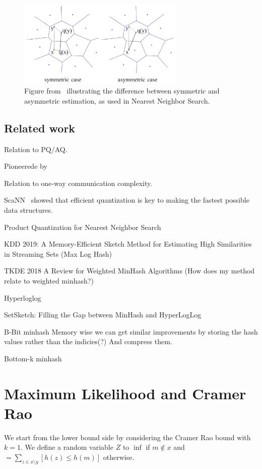 \begin{figure}[h]
   \centering
   \includegraphics[width=8cm]{figures/pq}
\caption{Figure from~\cite{jegou2010product} illustrating the difference between symmetric and asymmetric estimation, as used in Nearest Neighbor Search.
}
\end{figure}

\subsection{Related work}

Relation to PQ/AQ.

Pioneerede by~\cite{jegou2010product} 

Relation to one-way communication complexity.

ScaNN~\cite{guo2020accelerating} showed that efficient quantization is key to making the fastest possible data structures.

Product Quantization for Nearest Neighbor Search


KDD 2019: A Memory-Efficient Sketch Method for Estimating High Similarities in Streaming Sets
(Max Log Hash)

TKDE 2018 A Review for Weighted MinHash Algorithms
(How does my method relate to weighted minhash?)

Hyperloglog

SetSketch: Filling the Gap between MinHash and HyperLogLog

B-Bit minhash
Memory wise we can get similar improvements by storing the hash values rather than the indicies(?) And compress them.

Bottom-k minhash

\section{Maximum Likelihood and Cramer Rao}

We start from the lower bound side by considering the Cramer Rao bound with $k=1$.
We define a random variable $Z$ to $\inf$ if $m\not\in x$ and $
= \sum_{z\in x\setminus y} [h(z) \le h(m)]$ otherwise.

